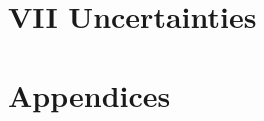 \documentclass[12pt]{article}
\begin{document}
\section{VII Uncertainties}
\newpage
\section{Appendices}
\end{document}
